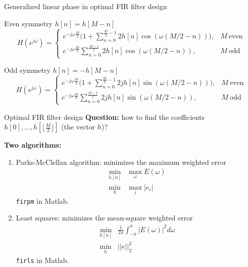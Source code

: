 \documentclass[10pt]{beamer}
\begin{document}
\begin{frame}{Generalized linear phase in optimal FIR filter design}
	
	\begin{block}{Even symmetry $h[n] = h[M-n]$}
		\vspace{-0.5cm}
		\begin{equation*}
		H(e^{j\omega}) = \begin{cases}
		e^{-j\omega\frac{M}{2}}\bigg(1 + \displaystyle\sum_{n = 0}^{\frac{M}{2}-1}2h[n]\cos(\omega(M/2-n))\bigg), & M~\text{even} \\
		e^{-j\omega\frac{M}{2}}\displaystyle\sum_{n = 0}^{\frac{M-1}{2}}2h[n]\cos(\omega(M/2-n)), & M~\text{odd} 
		\end{cases}
		\end{equation*}
	\end{block}
	\vspace{-0.25cm}
	\begin{block}{Odd symmetry $h[n] = -h[M-n]$}
		\vspace{-0.5cm}
		\begin{equation*}
		H(e^{j\omega}) = \begin{cases}
		e^{-j\omega \frac{M}{2}}\bigg(1 + \displaystyle\sum_{n = 0}^{\frac{M}{2}-1}2jh[n]\sin(\omega(M/2-n))\bigg), & M~\text{even} \\
		e^{-j\omega \frac{M}{2}}\displaystyle\sum_{n = 0}^{\frac{M-1}{2}}2jh[n]\sin(\omega(M/2-n)), & M~\text{odd} 
		\end{cases}
		\end{equation*}
	\end{block}
\end{frame}


\begin{frame}{Optimal FIR filter design}
	\textbf{Question:} how to find the coefficients $h[0], \ldots, h[\lfloor\frac{M}{2}\rfloor]$ (the vector $h$)?
	\vspace{0.25cm}
	
	\textbf{Two algorithms:}
	\begin{enumerate}
		\item Parks-McClellan algorithm: minimizes the maximum weighted error 
		\begin{align*}
		\min_{h[n]} &\max_\omega E(\omega) \tag{min-max problem} \\
		\min_{h} &\max_i |e_i| \tag{in matrix notation}
		\end{align*}
		\texttt{firpm} in Matlab.
		\item Least squares: minimizes the mean-square weighted error 
		\begin{align*}
		\min_{h[n]} &\frac{1}{2\pi}\int_{-\pi}^{\pi} |E(\omega)|^2d\omega \tag{least squares}\\
		\min_{h} &||e||_2^2 \tag{in matrix notation}
		\end{align*}
		\texttt{firls} in Matlab.
	\end{enumerate}
\end{frame}
\end{document}
